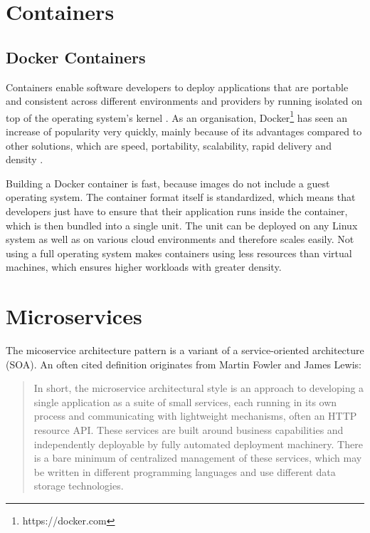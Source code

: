 \section{Containers}\label{containers}

\subsection{Docker Containers}\label{docker-containers}

Containers enable software developers to deploy applications that are
portable and consistent across different environments and providers
\cite{baier-kub} by running isolated on top of the operating system's
kernel \cite{bashari}. As an organisation, Docker\footnote{https://docker.com}
has seen an increase of popularity very quickly, mainly because of its
advantages compared to other solutions, which are speed, portability,
scalability, rapid delivery and density \cite{bashari}.

Building a Docker container is fast, because images do not include a
guest operating system. The container format itself is standardized,
which means that developers just have to ensure that their application
runs inside the container, which is then bundled into a single unit. The
unit can be deployed on any Linux system as well as on various cloud
environments and therefore scales easily. Not using a full operating
system makes containers using less resources than virtual machines,
which ensures higher workloads with greater density. \cite{joy2015}

\section{Microservices}\label{microservices}

The micoservice architecture pattern is a variant of a service-oriented
architecture (SOA). An often cited definition originates from Martin
Fowler and James Lewis:

\begin{quote}
In short, the microservice architectural style is an approach to
developing a single application as a suite of small services, each
running in its own process and communicating with lightweight
mechanisms, often an HTTP resource API. These services are built around
business capabilities and independently deployable by fully automated
deployment machinery. There is a bare minimum of centralized management
of these services, which may be written in different programming
languages and use different data storage technologies.
\cite{lewis2014microservices}
\end{quote}


